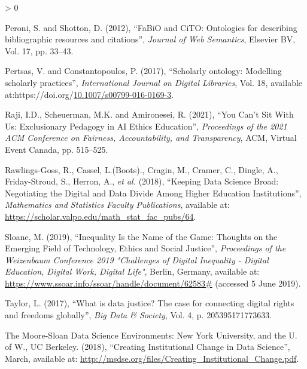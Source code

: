 \documentclass[
]{article}
\newlength{\cslhangindent}
\newenvironment{CSLReferences}[2] %
 {%
  \setlength{\parindent}{0pt}
  \ifodd #1 \everypar{\setlength{\hangindent}{\cslhangindent}}\ignorespaces\fi
  \ifnum #2 > 0
  \setlength{\parskip}{#2\baselineskip}
  \fi
 }%
 {}
\begin{document}
\begin{CSLReferences}{1}{0}
\leavevmode\hypertarget{ref-peroni2012}{}%
Peroni, S. and Shotton, D. (2012), {``FaBiO and CiTO: Ontologies for
describing bibliographic resources and citations''}, \emph{Journal of
Web Semantics}, Elsevier BV, Vol. 17, pp. 33--43.

\leavevmode\hypertarget{ref-pertsas_2017}{}%
Pertsas, V. and Constantopoulos, P. (2017), {``Scholarly ontology:
Modelling scholarly practices''}, \emph{International Journal on Digital
Libraries}, Vol. 18, available
at:https://doi.org/\href{https://doi.org/10.1007/s00799-016-0169-3}{10.1007/s00799-016-0169-3}.

\leavevmode\hypertarget{ref-rajiYouCanSit2021}{}%
Raji, I.D., Scheuerman, M.K. and Amironesei, R. (2021), {``You {Can}'t
{Sit} {With} {Us}: {Exclusionary} {Pedagogy} in {AI} {Ethics}
{Education}''}, \emph{Proceedings of the 2021 {ACM} {Conference} on
{Fairness}, {Accountability}, and {Transparency}}, ACM, Virtual Event
Canada, pp. 515--525.

\leavevmode\hypertarget{ref-rawlings-gossKeepingDataScience2018}{}%
Rawlings-Goss, R., Cassel, L.(Boots)., Cragin, M., Cramer, C., Dingle,
A., Friday-Stroud, S., Herron, A., \emph{et al.} (2018), {``Keeping
{Data} {Science} {Broad}: {Negotiating} the {Digital} and {Data}
{Divide} {Among} {Higher} {Education} {Institutions}''},
\emph{Mathematics and Statistics Faculty Publications}, available at:
\url{https://scholar.valpo.edu/math_stat_fac_pubs/64}.

\leavevmode\hypertarget{ref-sloaneInequalityNameGame2019a}{}%
Sloane, M. (2019), {``Inequality {Is} the {Name} of the {Game}:
{Thoughts} on the {Emerging} {Field} of {Technology}, {Ethics} and
{Social} {Justice}''}, \emph{Proceedings of the {Weizenbaum}
{Conference} 2019 "{Challenges} of {Digital} {Inequality} - {Digital}
{Education}, {Digital} {Work}, {Digital} {Life}"}, Berlin, Germany,
available at: \url{https://www.ssoar.info/ssoar/handle/document/62583\#}
(accessed 5 June 2019).

\leavevmode\hypertarget{ref-taylorWhatDataJustice2017}{}%
Taylor, L. (2017), {``What is data justice? {The} case for connecting
digital rights and freedoms globally''}, \emph{Big Data \& Society},
Vol. 4, p. 205395171773633.

\leavevmode\hypertarget{ref-themoore-sloandatascienceenvironments:newyorkuniversityucberkeleyandtheuniversityofwashingtonCreatingInstitutionalChange2018}{}%
The Moore-Sloan Data Science Environments: New York University, and the
U. of W., UC Berkeley. (2018), {``Creating {Institutional} {Change} in
{Data} {Science}''}, March, available at:
\url{http://msdse.org/files/Creating_Institutional_Change.pdf}.


\end{CSLReferences}
\end{document}
